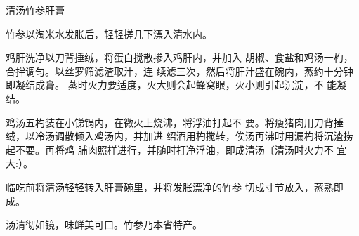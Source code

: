 \begin{recipe}{清汤竹参肝膏}

\ingredients






\cooking

竹参以淘米水发胀后，轻轻搓几下漂入清水内。

鸡肝洗净以刀背捶绒，将蛋白搅散掺入鸡肝内，并加入 胡椒、食盐和鸡汤一杓，合拌调匀。以丝罗筛滤渣取汁，连 续滤三次，然后将肝汁盛在碗内，蒸约十分钟即凝结成膏。 蒸时火力要适度，火大则会起蜂窝眼，火小则引起沉淀，不 能凝结。

鸡汤五杓装在小锑锅内，在微火上烧沸，将浮油打起不 要。将瘦猪肉用刀背捶绒，以冷汤调散倾入鸡汤内，并加进 绍酒用杓搅转，俟汤再沸时用漏杓将沉渣捞起不要。再将鸡 脯肉照样进行，并随时打净浮油，即成清汤〔清汤时火力不 宜大:）。

临吃前将清汤轻轻转入肝膏碗里，并将发胀漂净的竹参 切成寸节放入，蒸熟即成。

\notes

汤清彻如镜，味鲜美可口。竹参乃本省特产。

\end{recipe}

